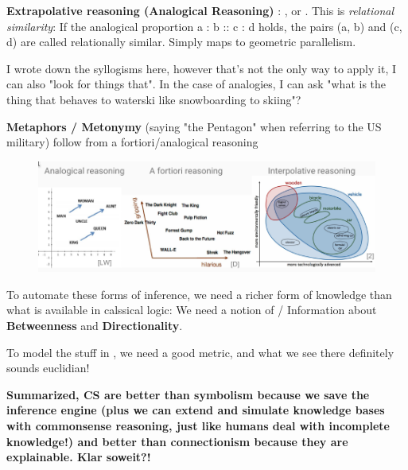 \vspace{2ex}

\textbf{Extrapolative reasoning (Analogical Reasoning)} \cite{Schockaert2011}: , or . This is \textit{relational similarity}: If the analogical proportion a : b :: c : d holds, the pairs (a, b) and (c, d) are called relationally similar. Simply maps to geometric parallelism. 

I wrote down the syllogisms here, however that's not the only way to apply it, I can also "look for things that". In the case of analogies, I can ask "what is the thing that behaves to waterski like snowboarding to skiing"?

\textbf{Metaphors / Metonymy} (saying "the Pentagon" when referring to the US military) follow from a fortiori/analogical reasoning


\begin{figure}[H]
	\centering
	\includegraphics[width=\textwidth]{graphics/stolenfigures/reasoning_samples.png}
    \label{fig:graphic_reasoning}
\end{figure}

To automate these forms of inference, we need a richer form of knowledge than what is available in calssical logic: We need a notion of / Information about \textbf{Betweenness} and \textbf{Directionality}.

To model the stuff in \autocite{fig:graphic_reasoning}, we need a good metric, and what we see there definitely sounds euclidian!

\textbf{Summarized, CS are better than symbolism because we save the inference engine (plus we can extend and simulate knowledge bases with commonsense reasoning, just like humans deal with incomplete knowledge!) and better than connectionism because they are explainable. Klar soweit?!}

